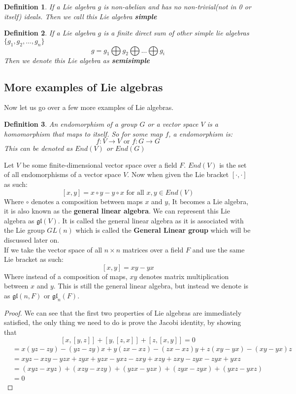 \documentclass[12pt, letterpaper]{article}
\newtheorem*{defn}{Definition}
\begin{document}
\begin{defn}
If a Lie algebra $g$ is non-abelian and has no non-trivial(not in 0 or itself) ideals. Then we call this Lie algebra \textbf{simple}
\end{defn}

\begin{defn}
If a Lie algebra $g$ is a finite direct sum of other simple lie algebras $\{ g_1, g_2, ..., g_n \}$
\[ g = g_1 \bigoplus g_2 \bigoplus ... \bigoplus g_i \]
Then we denote this Lie algebra as \textbf{semisimple}
\end{defn}



\subsection{More examples of Lie algebras}
Now let us go over a few more examples of Lie algebras. \\

\begin{defn}
An endomorphism of a group $G$ or a vector space $V$ is a homomorphism that maps to itself. So for some map $f$, a endomorphism is:
\[ f: V \rightarrow V  \text{ or } f: G \rightarrow G\]
This can be denoted as $End(V)$ or $End(G)$
\end{defn}

Let $V$ be some finite-dimensional vector space over a field $F$. $End(V)$ is the set of all endomorphisms of a vector space $V$. Now when given the Lie bracket $[\cdot, \cdot]$ as such:
\[ [x,y] = x \circ y - y \circ x \text{ for all } x,y\in End(V)\]
Where $\circ$ denotes a composition between maps $x$ and $y$, It becomes a Lie algebra, it is also known as the \textbf{general linear algebra}. We can represent this Lie algebra as $\mathfrak{gl}(V)$. It is called the general linear algebra as it is associated with the Lie group $GL(n)$ which is called the \textbf{General Linear group} which will be discussed later on.\\

If we take the vector space of all $n \times n$ matrices over a field $F$ and use the same Lie bracket as such:
\[ [x,y] = xy - yx \]
Where instead of a composition of maps, $xy$ denotes matrix multiplication between $x$ and $y$. This is still the general linear algebra, but instead we denote is as $\mathfrak{gl}(n, F)$ or $\mathfrak{gl}_n(F)$.


\begin{proof}
We can see that the first two properties of Lie algebras are immediately satisfied, the only thing we need to do is prove the Jacobi identity, by showing that 
\[[x,[y,z]] + [y,[z,x]] + [z,[x,y]] = 0\]
\begin{align*}
&= x(yz - zy) - (yz-zy)x + y(zx-xz) - (zx - xz)y + z(xy - yx) - (xy- yx)z\\
&= xyz - xzy - yzx + zyx + yzx - yxz - zxy + xzy +zxy - zyx - zyx + yxz\\
&= (xyz - xyz) + (xzy-xzy) + (yzx - yzx) + (zyx-zyx) + (yxz-yxz)\\
&= 0
\end{align*}
\end{proof}
\end{document}
